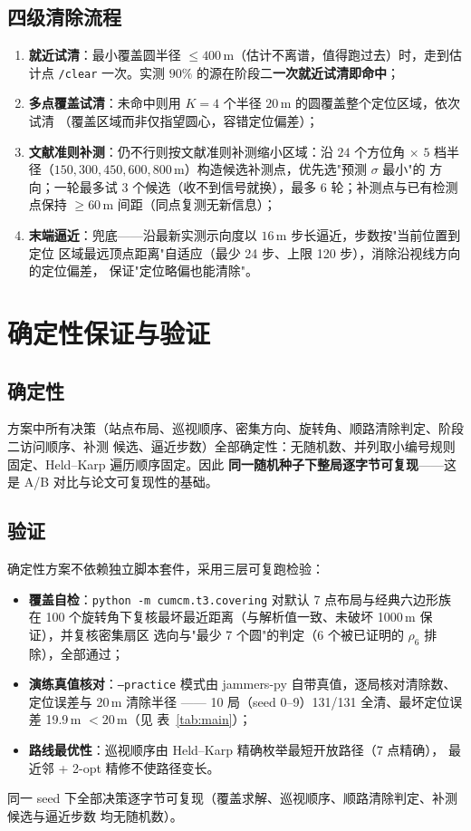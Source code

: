 \documentclass[a4paper,11pt]{ctexart}
\newcommand{\code}[1]{\texttt{#1}}
\newcommand{\tabref}[1]{表~\ref{#1}}
\begin{document}
\subsection{四级清除流程}
\begin{enumerate}
  \item \textbf{就近试清}：最小覆盖圆半径 $\le 400$\,m（估计不离谱，值得跑过去）时，走到估计点
        \code{/clear} 一次。实测 $90\%$ 的源在阶段二\textbf{一次就近试清即命中}；
  \item \textbf{多点覆盖试清}：未命中则用 $K=4$ 个半径 $20$\,m 的圆覆盖整个定位区域，依次试清
        （覆盖区域而非仅指望圆心，容错定位偏差）；
  \item \textbf{文献准则补测}：仍不行则按文献准则补测缩小区域：沿 $24$ 个方位角 $\times$
        $5$ 档半径（$150,300,450,600,800$\,m）构造候选补测点，优先选"预测 $\sigma$ 最小"的
        方向；一轮最多试 $3$ 个候选（收不到信号就换），最多 $6$ 轮；补测点与已有检测点保持
        $\ge 60$\,m 间距（同点复测无新信息）；
  \item \textbf{末端逼近}：兜底——沿最新实测示向度以 $16$\,m 步长逼近，步数按"当前位置到定位
        区域最远顶点距离"自适应（最少 24 步、上限 120 步），消除沿视线方向的定位偏差，
        保证"定位略偏也能清除"。
\end{enumerate}

\section{确定性保证与验证}
\subsection{确定性}
方案中所有决策（站点布局、巡视顺序、密集方向、旋转角、顺路清除判定、阶段二访问顺序、补测
候选、逼近步数）全部确定性：无随机数、并列取小编号规则固定、Held--Karp 遍历顺序固定。因此
\textbf{同一随机种子下整局逐字节可复现}——这是 A/B 对比与论文可复现性的基础。

\subsection{验证}
确定性方案不依赖独立脚本套件，采用三层可复跑检验：
\begin{itemize}
  \item \textbf{覆盖自检}：\code{python -m cumcm.t3.covering} 对默认 7 点布局与经典六边形族在
        100 个旋转角下复核最坏最近距离（与解析值一致、未破坏 1000\,m 保证），并复核密集扇区
        选向与"最少 7 个圆"的判定（6 个被已证明的 $\rho_6$ 排除），全部通过；
  \item \textbf{演练真值核对}：\code{--practice} 模式由 jammers-py 自带真值，逐局核对清除数、
        定位误差与 20\,m 清除半径 —— 10 局（seed 0--9）131/131 全清、最坏定位误差 19.9\,m
        $<20$\,m（见 \tabref{tab:main}）；
  \item \textbf{路线最优性}：巡视顺序由 Held--Karp 精确枚举最短开放路径（7 点精确），
        最近邻 + 2-opt 精修不使路径变长。
\end{itemize}
同一 seed 下全部决策逐字节可复现（覆盖求解、巡视顺序、顺路清除判定、补测候选与逼近步数
均无随机数）。
\end{document}
